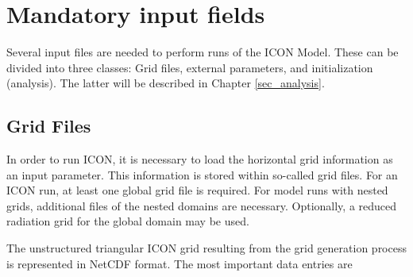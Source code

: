 \chapter{Mandatory input fields}

Several input files are needed to perform runs of the ICON Model. 
%
These can be divided into three classes:
%
Grid files, external parameters, and initialization (analysis). The latter 
will be described in Chapter \ref{sec_analysis}.


\section{Grid Files}
\label{section:grid_files}

In order to run ICON, it is necessary to load the horizontal grid
information as an input para\-meter. 
This information is stored within so-called grid files. For an ICON 
run, at least one global grid file is required.
For model runs with nested grids, additional files of the nested
domains are necessary. Optionally, a reduced radiation grid for
the global domain may be used.

%
The unstructured triangular ICON grid resulting from the grid
generation process is represented in NetCDF format.  The most
important data entries are

